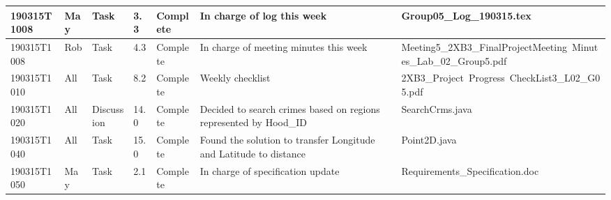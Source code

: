 \documentclass[10pt]{article}
\begin{document}
\begin{tabular}{|p{2cm}| p{1cm}| p{2cm}| p{1cm}| p{1.5cm}| p{4cm}| p{5cm}|}
 \hline 
     190315T1008& May & Task & 3.3 & Complete & In charge of log this week &  Group05\_Log\_190315.tex\\
 \hline 
  190315T1008& Rob & Task & 4.3 & Complete & In charge of meeting minutes this week &Meeting5\_2XB3\_FinalProjectMeeting\
  Minutes\_Lab\_02\_Group5.pdf\\
  \hline 
     190315T1010& All & Task & 8.2 & Complete &  Weekly checklist & 2XB3\_Project\ Progress\ CheckList3\_L02\_G05.pdf\\
   \hline 
     190315T1020& All & Discussion & 14.0 & Complete &  Decided to search crimes based on regions represented by Hood\_ID & SearchCrms.java\\
  \hline 
   190315T1040&  All & Task & 15.0 & Complete & Found the solution to transfer Longitude and Latitude to distance& Point2D.java\\
 \hline 
  190315T1050&  May & Task & 2.1 & Complete & In charge of specification update & Requirements\_Specification.doc\\
 \hline
 
\end{tabular}
\end{document}
